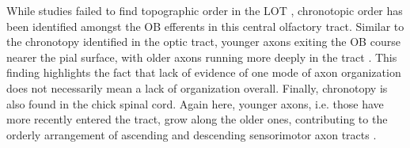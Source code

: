 While studies failed to find topographic order in the LOT \cite{price1975observation}, chronotopic order has been identified amongst the OB efferents in this central olfactory tract.
Similar to the chronotopy identified in the optic tract, younger axons exiting the OB course nearer the pial surface, with older axons running more deeply in the tract \cite{yamatani2004chronotopic}. 
This finding highlights the fact that lack of evidence of one mode of axon organization does not necessarily mean a lack of organization overall.
Finally, chronotopy is also found in the chick spinal cord.
Again here, younger axons, i.e. those have more recently entered the tract, grow along the older ones, contributing to the orderly arrangement of ascending and descending sensorimotor axon tracts \cite{nornes1980pattern}.